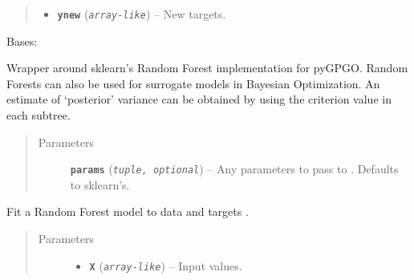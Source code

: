 \documentclass[letterpaper,10pt,english]{sphinxmanual}
\begin{document}
\begin{fulllineitems}
\begin{fulllineitems}
\begin{quote}
\begin{description}
\begin{itemize}
\item {} 
\textbf{\texttt{ynew}} (\emph{\texttt{array-like}}) -- New targets.

\end{itemize}

\end{description}\end{quote}

\end{fulllineitems}


\end{fulllineitems}


\begin{fulllineitems}
\label{pyGPGO.surrogates.RandomForest:pyGPGO.surrogates.RandomForest.RandomForest}
Bases: \href{https://docs.python.org/2/library/functions.html\#object}{}

Wrapper around sklearn's Random Forest implementation for pyGPGO.
Random Forests can also be used for surrogate models in Bayesian Optimization.
An estimate of `posterior' variance can be obtained by using the 
criterion value in each subtree.
\begin{quote}\begin{description}
\item[{Parameters}] \leavevmode
\textbf{\texttt{params}} (\emph{\texttt{tuple, optional}}) -- Any parameters to pass to . Defaults to sklearn's.

\end{description}\end{quote}

\begin{fulllineitems}
\label{pyGPGO.surrogates.RandomForest:pyGPGO.surrogates.RandomForest.RandomForest.fit}
Fit a Random Forest model to data  and targets .
\begin{quote}\begin{description}
\item[{Parameters}] \leavevmode\begin{itemize}
\item {} 
\textbf{\texttt{X}} (\emph{\texttt{array-like}}) -- Input values.


\end{itemize}
\end{description}
\end{quote}
\end{fulllineitems}
\end{fulllineitems}
\end{document}
